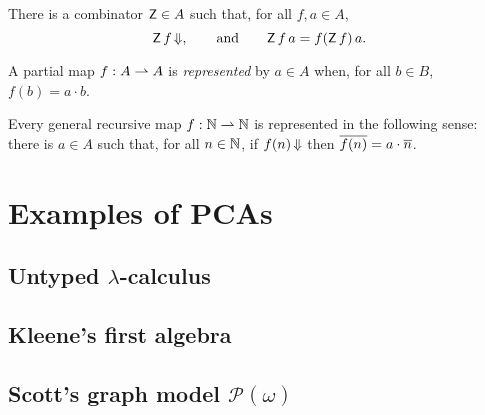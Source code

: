 \begin{definition}
  \label{def:combinator-fix}
  There is a combinator $\mathsf{Z} \in A$ such that, for all $f, a \in A$,
  \begin{equation*}
    \mathsf{Z} \, f\,{\Downarrow},
    \qquad\text{and}\qquad
    \mathsf{Z} \, f \, a = f (\mathsf{Z} \, f) \, a.
  \end{equation*}
\end{definition}

\begin{definition}
  \label{def:representable-function}
  A partial map $f : A \rightharpoonup A$ is \emph{represented} by $a \in A$ when,
  for all $b \in B$, $f(b) = a \cdot b$.
\end{definition}

\begin{theorem}
  \label{thm:recursive-map-representable}
  Every general recursive map $f : \mathbb{N} \rightharpoonup \mathbb{N}$ is represented in the following sense:
  there is $a \in A$ such that, for all $n \in \mathbb{N}$, if $f(n)\,{\Downarrow}$ then $\overline{f(n)} = a \cdot \overline{n}$.
\end{theorem}

\section{Examples of PCAs}

\subsection{Untyped $\lambda$-calculus}
\label{sec:untyped-lambda-calculus}

\subsection{Kleene's first algebra}
\label{sec:kleenes-first-algebra}

\subsection{Scott's graph model $\mathcal{P}(\omega)$}
\label{sec:scotts-graph-model}



